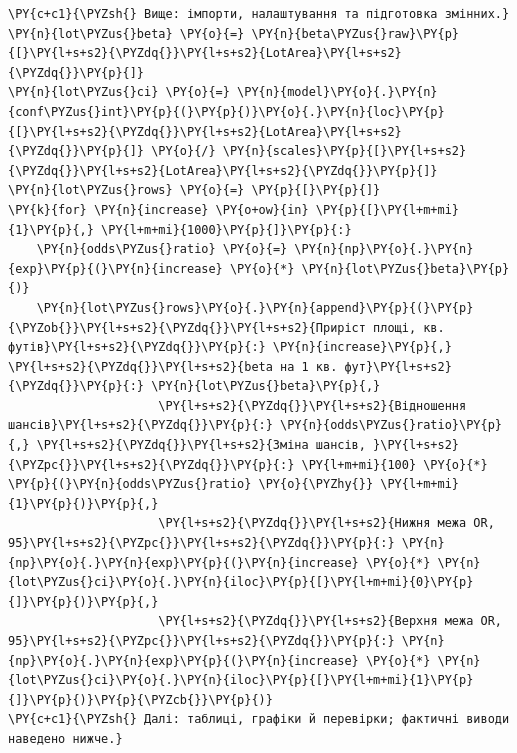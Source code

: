 \begin{Verbatim}[commandchars=\\\{\}]
\PY{c+c1}{\PYZsh{} Вище: імпорти, налаштування та підготовка змінних.}
\PY{n}{lot\PYZus{}beta} \PY{o}{=} \PY{n}{beta\PYZus{}raw}\PY{p}{[}\PY{l+s+s2}{\PYZdq{}}\PY{l+s+s2}{LotArea}\PY{l+s+s2}{\PYZdq{}}\PY{p}{]}
\PY{n}{lot\PYZus{}ci} \PY{o}{=} \PY{n}{model}\PY{o}{.}\PY{n}{conf\PYZus{}int}\PY{p}{(}\PY{p}{)}\PY{o}{.}\PY{n}{loc}\PY{p}{[}\PY{l+s+s2}{\PYZdq{}}\PY{l+s+s2}{LotArea}\PY{l+s+s2}{\PYZdq{}}\PY{p}{]} \PY{o}{/} \PY{n}{scales}\PY{p}{[}\PY{l+s+s2}{\PYZdq{}}\PY{l+s+s2}{LotArea}\PY{l+s+s2}{\PYZdq{}}\PY{p}{]}
\PY{n}{lot\PYZus{}rows} \PY{o}{=} \PY{p}{[}\PY{p}{]}
\PY{k}{for} \PY{n}{increase} \PY{o+ow}{in} \PY{p}{[}\PY{l+m+mi}{1}\PY{p}{,} \PY{l+m+mi}{1000}\PY{p}{]}\PY{p}{:}
    \PY{n}{odds\PYZus{}ratio} \PY{o}{=} \PY{n}{np}\PY{o}{.}\PY{n}{exp}\PY{p}{(}\PY{n}{increase} \PY{o}{*} \PY{n}{lot\PYZus{}beta}\PY{p}{)}
    \PY{n}{lot\PYZus{}rows}\PY{o}{.}\PY{n}{append}\PY{p}{(}\PY{p}{\PYZob{}}\PY{l+s+s2}{\PYZdq{}}\PY{l+s+s2}{Приріст площі, кв. футів}\PY{l+s+s2}{\PYZdq{}}\PY{p}{:} \PY{n}{increase}\PY{p}{,} \PY{l+s+s2}{\PYZdq{}}\PY{l+s+s2}{beta на 1 кв. фут}\PY{l+s+s2}{\PYZdq{}}\PY{p}{:} \PY{n}{lot\PYZus{}beta}\PY{p}{,}
                     \PY{l+s+s2}{\PYZdq{}}\PY{l+s+s2}{Відношення шансів}\PY{l+s+s2}{\PYZdq{}}\PY{p}{:} \PY{n}{odds\PYZus{}ratio}\PY{p}{,} \PY{l+s+s2}{\PYZdq{}}\PY{l+s+s2}{Зміна шансів, }\PY{l+s+s2}{\PYZpc{}}\PY{l+s+s2}{\PYZdq{}}\PY{p}{:} \PY{l+m+mi}{100} \PY{o}{*} \PY{p}{(}\PY{n}{odds\PYZus{}ratio} \PY{o}{\PYZhy{}} \PY{l+m+mi}{1}\PY{p}{)}\PY{p}{,}
                     \PY{l+s+s2}{\PYZdq{}}\PY{l+s+s2}{Нижня межа OR, 95}\PY{l+s+s2}{\PYZpc{}}\PY{l+s+s2}{\PYZdq{}}\PY{p}{:} \PY{n}{np}\PY{o}{.}\PY{n}{exp}\PY{p}{(}\PY{n}{increase} \PY{o}{*} \PY{n}{lot\PYZus{}ci}\PY{o}{.}\PY{n}{iloc}\PY{p}{[}\PY{l+m+mi}{0}\PY{p}{]}\PY{p}{)}\PY{p}{,}
                     \PY{l+s+s2}{\PYZdq{}}\PY{l+s+s2}{Верхня межа OR, 95}\PY{l+s+s2}{\PYZpc{}}\PY{l+s+s2}{\PYZdq{}}\PY{p}{:} \PY{n}{np}\PY{o}{.}\PY{n}{exp}\PY{p}{(}\PY{n}{increase} \PY{o}{*} \PY{n}{lot\PYZus{}ci}\PY{o}{.}\PY{n}{iloc}\PY{p}{[}\PY{l+m+mi}{1}\PY{p}{]}\PY{p}{)}\PY{p}{\PYZcb{}}\PY{p}{)}
\PY{c+c1}{\PYZsh{} Далі: таблиці, графіки й перевірки; фактичні виводи наведено нижче.}
\end{Verbatim}
